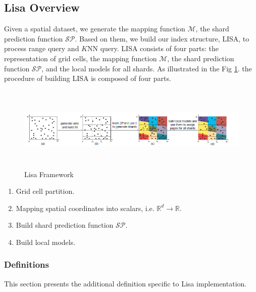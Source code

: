 \subsection{Lisa Overview}


Given a spatial dataset, we generate the mapping function $\mathcal{M}$, the shard prediction function $\mathcal{SP}$. Based on them, we build our index structure, LISA, to process range query and $K$NN query. LISA consists of four parts: the representation of grid cells, the mapping function $\mathcal{M}$, the shard prediction function $\mathcal{SP}$, and the local models for all shards. As illustrated in the Fig \ref{fig:Lisa_Framework}. the procedure of building LISA is composed of four parts.

\begin{figure}[t]
    \centering
    \includegraphics[width=17cm,height=4cm]{graphs/Lisa_Overview.png}
    \caption{Lisa Framework }
    \label{fig:Lisa_Framework}
\end{figure}

\begin{enumerate}
	\item Grid cell partition.
	\item Mapping spatial coordinates into scalars, i.e. $\mathbb{R}^d\to\mathbb{R}$.
	\item Build shard prediction function $\mathcal{SP}$.
	\item Build local models.
\end{enumerate}

\subsubsection{Definitions}

This section presents the additional definition specific to Lisa implementation.

